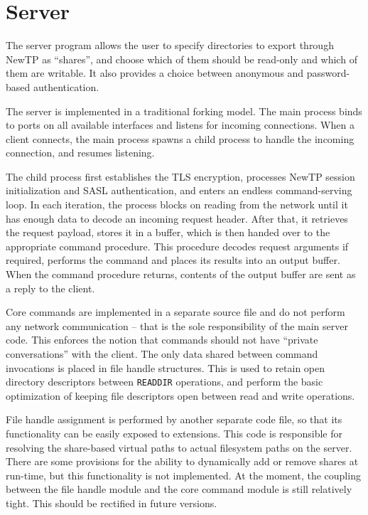 \section{Server}

The server program allows the user to specify directories to export through NewTP as ``shares'', and choose
which of them should be read-only and which of them are writable. It also provides a choice between anonymous
and password-based authentication.

The server is implemented in a traditional forking model. The main process binds to ports on all available
interfaces and listens for incoming connections. When a client connects, the main process spawns a child
process to handle the incoming connection, and resumes listening.

The child process first establishes the TLS encryption, processes NewTP session initialization and SASL
authentication, and enters an endless command-serving loop. In each iteration, the process blocks on reading
from the network until it has enough data to decode an incoming request header. After that, it retrieves the
request payload, stores it in a buffer, which is then handed over to the appropriate command procedure. This
procedure decodes request arguments if required, performs the command and places its results into an output
buffer.  When the command procedure returns, contents of the output buffer are sent as a reply to the client.

Core commands are implemented in a separate source file and do not perform any network communication -- that
is the sole responsibility of the main server code. This enforces the notion that commands should not have
``private conversations'' with the client. The only data shared between command invocations is placed in file
handle structures. This is used to retain open directory descriptors between {\tt READDIR} operations, and
perform the basic optimization of keeping file descriptors open between read and write operations.

File handle assignment is performed by another separate code file, so that its functionality can be easily
exposed to extensions. This code is responsible for resolving the share-based virtual paths to actual
filesystem paths on the server. There are some provisions for the ability to dynamically add or remove
shares at run-time, but this functionality is not implemented. At the moment, the coupling between the file
handle module and the core command module is still relatively tight. This should be rectified in
future versions.

